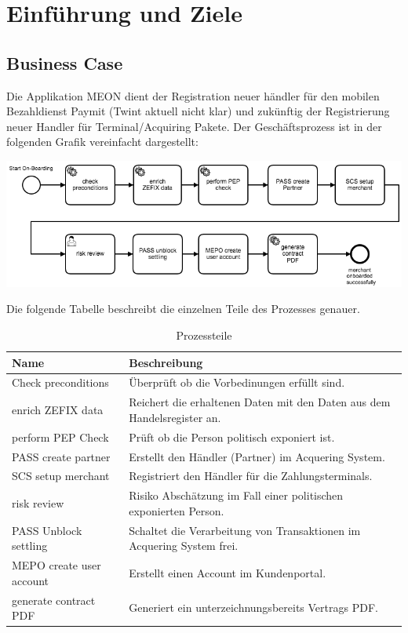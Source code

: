 \graphicspath{{./images/}}


\chapter{Einführung und Ziele}

\section{Business Case}
\label{businesscase}

Die Applikation MEON dient der Registration neuer händler für den mobilen Bezahldienst Paymit (Twint aktuell nicht klar) und zukünftig der Registrierung neuer Handler für Terminal/Acquiring Pakete.  Der Geschäftsprozess ist in der folgenden Grafik vereinfacht dargestellt:

\begin{center}
	\includegraphics[scale=0.55]{meon-workflow.png}
\end{center}

Die folgende Tabelle beschreibt die einzelnen Teile des Prozesses genauer.

\begin{table}[H]
	\centering
	\caption{Prozessteile}
	\begin{tabular}{ | p{4cm} | p{12cm} | }
		\toprule
		{\textbf{Name}} & {\textbf{Beschreibung}} \\
		\midrule
		Check preconditions & Überprüft ob die Vorbedinungen erfüllt sind. \\ \hline
		enrich ZEFIX data & Reichert die erhaltenen Daten mit den Daten aus dem Handelsregister an. \\ \hline
		perform PEP Check & Prüft ob die Person politisch exponiert ist. \\ \hline
		PASS create partner & Erstellt den Händler (Partner) im Acquering System.\\ \hline
		SCS setup merchant & Registriert den Händler für die Zahlungsterminals. \\ \hline
		risk review  & Risiko Abschätzung im Fall einer politischen exponierten Person. \\ \hline
	    PASS Unblock settling & Schaltet die Verarbeitung von Transaktionen im Acquering System frei. \\ \hline
	    MEPO create user account&  Erstellt einen Account im Kundenportal. \\ \hline
	    generate contract PDF & Generiert ein unterzeichnungsbereits Vertrags PDF.  \\
		\bottomrule
	\end{tabular}
\end{table}

